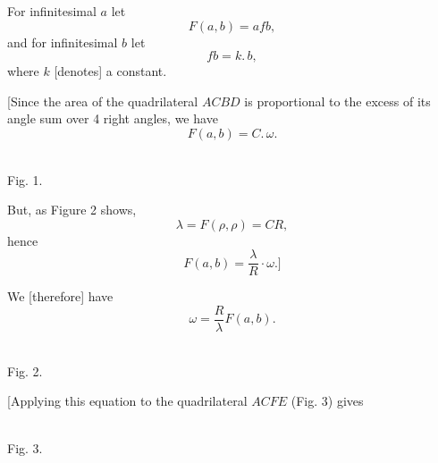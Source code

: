 %
For infinitesimal $a$ let
\[
F(a, b) = afb,
\]
and for infinitesimal $b$ let
\[
fb = k.\,b,
\]
where $k$ [denotes] a constant.

[Since the area of the quadrilateral $ACBD$ is proportional to the excess of its angle sum over 4 right angles, we have
\[
F(a, b) = C.\,\omega.
\]

\begin{center}\begin{minipage}{\linewidth}\centering\\[3pt]Fig. 1.\end{minipage}\end{center}

But, as Figure 2 shows,
\[
\lambda = F(\rho, \rho) = CR,
\]
hence
\[
F(a,b) = \frac{\lambda}{R}\cdot\omega.]
\]

We [therefore] have
\[
\tag*{1)} \omega = \frac{R}{\lambda} F(a,b).
\]

\begin{center}\begin{minipage}{\linewidth}\centering\\[3pt]Fig. 2.\end{minipage}\end{center}

[Applying this equation to the quadrilateral $ACFE$ (Fig. 3) gives

\begin{center}\begin{minipage}{\linewidth}\centering\\[3pt]Fig. 3.\end{minipage}\end{center}
